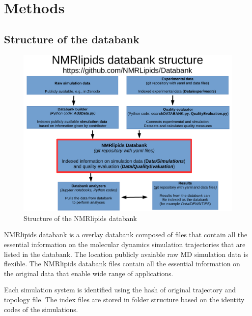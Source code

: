\documentclass[fleqn,10pt]{wlscirep}
\begin{document}

\section{Methods}


\subsection{Structure of the databank}

\begin{figure}
  \includegraphics[width=\textwidth]{figures/DataBankStructure.pdf}
  \caption{Structure of the NMRlipids databank}\label{DatabankStructure}
\end{figure}

NMRlipids databank is a overlay databank composed of files that contain all the essential information
on the molecular dynamics simulation trajectories that are listed in the databank.
The location publicly avaiable raw MD simulation data is flexible.
The NMRlipids databank files contain all the essential information on the
original data that enable wide range of applications.

Each simulation system is identified using the hash of original trajectory and topology file. The index files are stored in folder structure based on the identity codes of the simulations.
\end{document}
